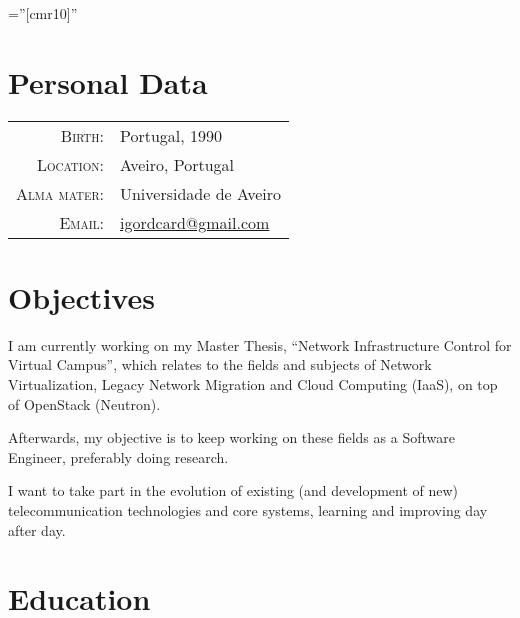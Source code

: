 \documentclass[a4paper,10pt]{article} %
\begin{document}
\pagestyle{empty} %

\font\fb=''[cmr10]'' %



\par{\bigskip\par} %

\section{Personal Data}

\begin{tabular}{rl}
\textsc{Birth:} & Portugal, 1990 \\
\textsc{Location:} & Aveiro, Portugal \\
\textsc{Alma mater:} & Universidade de Aveiro\\
\textsc{Email:} & \href{mailto:igordcard+cv@gmail.com}{igordcard@gmail.com}
\end{tabular}


\section{Objectives}

I am currently working on my Master Thesis, ``Network Infrastructure Control for Virtual Campus'', 
which relates to the fields and subjects of Network Virtualization, Legacy Network Migration and Cloud Computing (IaaS), 
on top of OpenStack (Neutron).

Afterwards, my objective is to keep working on these fields as a Software Engineer, preferably doing research.

I want to take part in the evolution of existing (and development of new) telecommunication technologies 
and core systems, learning and improving day after day.



\section{Education}
\end{document}
